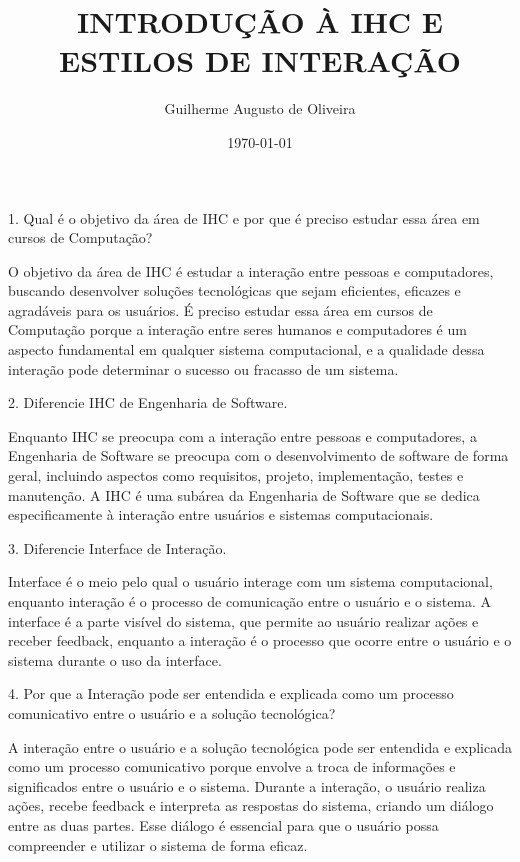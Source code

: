 \documentclass[12pt,a4paper]{article}
\title{INTRODUÇÃO À IHC E ESTILOS DE INTERAÇÃO}
\author{Guilherme Augusto de Oliveira}
\date{\today}
\begin{document}
\maketitle

1. Qual é o objetivo da área de IHC e por que é preciso estudar essa área em cursos de Computação?

O objetivo da área de IHC é estudar a interação entre pessoas e computadores, buscando desenvolver soluções tecnológicas que sejam eficientes, eficazes e agradáveis para os usuários. É preciso estudar essa área em cursos de Computação porque a interação entre seres humanos e computadores é um aspecto fundamental em qualquer sistema computacional, e a qualidade dessa interação pode determinar o sucesso ou fracasso de um sistema.

\vspace{1cm}

2. Diferencie IHC de Engenharia de Software.

Enquanto IHC se preocupa com a interação entre pessoas e computadores, a Engenharia de Software se preocupa com o desenvolvimento de software de forma geral, incluindo aspectos como requisitos, projeto, implementação, testes e manutenção. A IHC é uma subárea da Engenharia de Software que se dedica especificamente à interação entre usuários e sistemas computacionais.

\vspace{1cm}

3. Diferencie Interface de Interação.

Interface é o meio pelo qual o usuário interage com um sistema computacional, enquanto interação é o processo de comunicação entre o usuário e o sistema. A interface é a parte visível do sistema, que permite ao usuário realizar ações e receber feedback, enquanto a interação é o processo que ocorre entre o usuário e o sistema durante o uso da interface.

\vspace{1cm}

4. Por que a Interação pode ser entendida e explicada como um processo comunicativo entre o usuário e a solução tecnológica?

A interação entre o usuário e a solução tecnológica pode ser entendida e explicada como um processo comunicativo porque envolve a troca de informações e significados entre o usuário e o sistema. Durante a interação, o usuário realiza ações, recebe feedback e interpreta as respostas do sistema, criando um diálogo entre as duas partes. Esse diálogo é essencial para que o usuário possa compreender e utilizar o sistema de forma eficaz.
\end{document}
